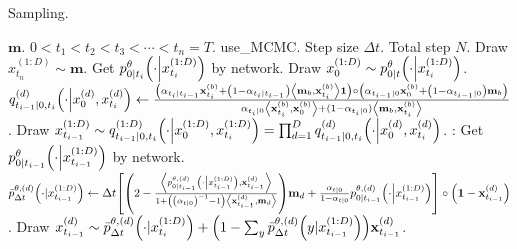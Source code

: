\documentclass[10pt]{article}
\begin{document}
\begin{algorithm}
  \caption{Sampling.}
  \label{SampleAlg}
  \begin{algorithmic}
    \Require $\mathbf{m}$. $0<t_1<t_2<t_3<\cdots<t_n=T$.
    \Ensure use\_MCMC. Step size $\Delta t$. Total step $N$.
    \State Draw $x^{(1:D)}_{t_n}\sim \mathbf{m}$.
    \State Get $p^\theta_{0|t_i}\qty(\cdot\middle|x^{(1:D)}_{t_i})$ by network.
    \State Draw $x^{(1:D)}_0\sim p^\theta_{0|t}\qty(\cdot\middle|x^{(1:D)}_{t_i})$.
    \State $q^{(d)}_{t_{i-1}|0,t_i}\qty(\cdot\middle|x^{(d)}_0,x^{(d)}_{t_i})\gets \frac{\qty(\alpha_{t_i|t_{i-1}}\mathbf{x}^{(b)}_{t_i} + \qty(1-\alpha_{t_i|t_{i-1}})\left\langle\mathbf{m}_b,\mathbf{x}^{(b)}_{t_i}\right\rangle\mathbf{1})\circ\qty(\alpha_{t_{i-1}|0}\mathbf{x}^{(b)}_0+\qty(1-\alpha_{t_{i-1}|0})\mathbf{m}_b)}{\alpha_{t_i|0}\left\langle\mathbf{x}^{(b)}_{t_i}, \mathbf{x}^{(b)}_0\right\rangle + (1-\alpha_{t_i|0})\left\langle\mathbf{m}_b, \mathbf{x}^{(b)}_{t_i}\right\rangle}$.
    \State Draw $x^{(1:D)}_{t_{i-1}}\sim q^{(1:D)}_{t_{i-1}|0,t_i}\qty(\cdot\middle|x^{(1:D)}_0,x^{(1:D)}_{t_i})=\prod_{d=1}^D q^{(d)}_{t_{i-1}|0,t_i}\qty(\cdot\middle|x^{(d)}_0,x^{(d)}_{t_i})$.
    :
    \State Get $p^\theta_{0|t_{i-1}}\qty(\cdot\middle|x^{(1:D)}_{t_{i-1}})$ by network.
    \State $\bar{p}^{\theta,(d)}_{\Delta t}\qty(\cdot|x^{(1:D)}_{t_{i-1}})\gets \Delta t\qty[\qty(2-\frac{\left\langle p^{\theta,(d)}_{0|t_{i-1}}\qty(\cdot\middle|x^{(1:D)}_{t_{i-1}}),\mathbf{x}^{(d)}_{t_{i-1}}\right\rangle}{1+\qty(\qty(\alpha_{t|0})^{-1}-1)\left\langle \mathbf{x}^{(d)}_{t_{i-1}},\mathbf{m}_d\right\rangle})\mathbf{m}_d + \frac{\alpha_{t|0}}{1-\alpha_{t|0}}p^{\theta,(d)}_{0|t_{i-1}}\qty(\cdot\middle|x^{(1:D)}_{t_{i-1}})]\circ\qty(\mathbf{1}-\mathbf{x}^{(d)}_{t_{i-1}})$.
    \State Draw $x^{(d)}_{t_{i-1}}\sim \bar{p}^{\theta,(d)}_{\Delta t}\qty(\cdot|x^{(1:D)}_{t_i}) + \qty(1-\sum_{y}\bar{p}^{\theta,(d)}_{\Delta t}\qty(y|x^{(1:D)}_{t_{i-1}}))\mathbf{x}^{(d)}_{t_{i-1}}$.
    \EndFor
    \EndIf
    \EndFor
  \end{algorithmic}
\end{algorithm}

\appendix
\end{document}
